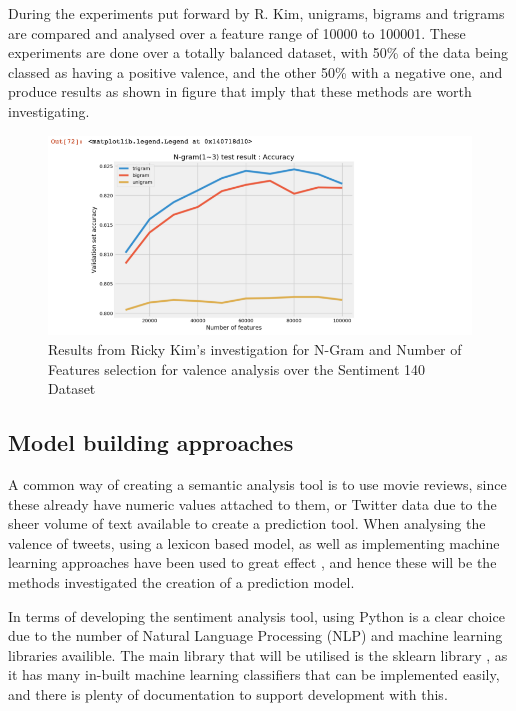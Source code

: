 During the experiments put forward by R. Kim, unigrams, bigrams and trigrams are compared and analysed over a feature range of 10000 to 100001. These experiments are done over a totally balanced dataset, with 50\% of the data being classed as having a positive valence, and the other 50\% with a negative one, and produce results as shown in figure that imply that these methods are worth investigating.


\begin{figure}[h]
\caption{Results from Ricky Kim's investigation for N-Gram and Number of Features selection for valence analysis over the Sentiment 140 Dataset \cite{go2016sentiment140}}
\centering
\includegraphics[scale=0.5]{litImgs/towardsDSNgramNFeatures.png}
\end{figure}


\subsection{Model building approaches}

A common way of creating a semantic analysis tool is to use movie reviews, since these already have numeric values attached to them, or Twitter data due to the sheer volume of text available to create a prediction tool.
When analysing the valence of tweets, using a lexicon based model, as well as implementing machine learning approaches have been used to great effect \cite{kolchyna2015twitter}, and hence these will be the methods investigated the creation of a prediction model.

In terms of developing the sentiment analysis tool, using Python is a clear choice due to the number of Natural Language Processing (NLP) and machine learning libraries availible. The main library that will be utilised is the sklearn library \cite{sklearn}, as it has many in-built machine learning classifiers that can be implemented easily, and there is plenty of documentation to support development with this. 

